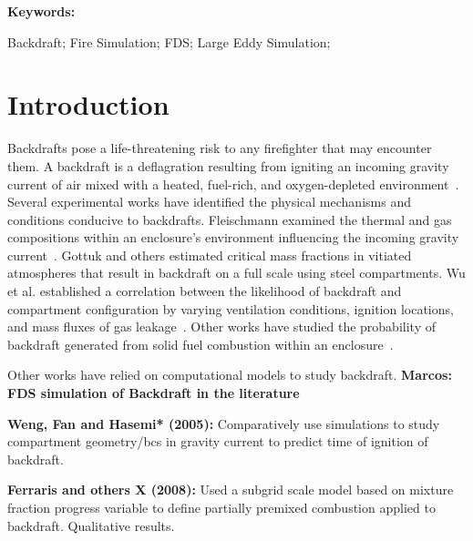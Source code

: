 \documentclass[12pt,letterpaper]{article}
\begin{document}
\begin{flushleft}
\textbf{Keywords:}

Backdraft; Fire Simulation; FDS; Large Eddy Simulation; 

\section{Introduction}
Backdrafts pose a life-threatening risk to any firefighter that may encounter them. A backdraft is a deflagration resulting from igniting an incoming gravity current of air mixed with a heated, fuel-rich, and oxygen-depleted environment~\cite{fleischmann2013defining}. Several experimental works have identified the physical mechanisms and conditions conducive to backdrafts. Fleischmann examined the thermal and gas compositions within an enclosure's environment influencing the incoming gravity current~\cite{fleischmann1993backdraft,fleischmann1994quantitative}. Gottuk and others estimated critical mass fractions in vitiated atmospheres that result in backdraft on a full scale using steel compartments. Wu et al. established a correlation between the likelihood of backdraft and compartment configuration by varying ventilation conditions, ignition locations, and mass fluxes of gas leakage~\cite{wu2011experimental}. Other works have studied the probability of backdraft generated from solid fuel combustion within an enclosure~\cite{hayasaka2008backdraft,tsai2013full,zhao2021experimental}.



Other works have relied on computational models to study backdraft. \textbf{Marcos: FDS simulation of Backdraft in the literature}

\textbf{Weng, Fan and Hasemi* (2005):}
Comparatively use simulations to study compartment geometry/bcs in gravity current to predict time of ignition of backdraft.


\textbf{Ferraris and others X (2008):}
Used a subgrid scale model based on mixture fraction progress variable to define partially premixed combustion applied to backdraft. Qualitative results.



\end{flushleft}
\end{document}
